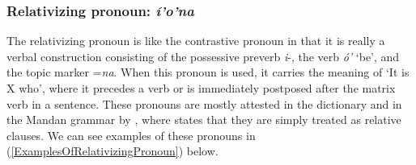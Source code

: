 \subsubsection{Relativizing pronoun: \textit{í'o'na}}\label{SubSubSecRelativizingPronoun}

The relativizing pronoun is like the contrastive pronoun in that it is really a verbal construction consisting of the possessive preverb \textit{i}-, the verb \textit{ó'} `be', and the topic marker =\textit{na}. When this pronoun is used, it carries the meaning of `It is X who', where it precedes a verb or is immediately postposed after the matrix verb in a sentence. These pronouns are mostly attested in the \citet{hollow1970} dictionary and in the Mandan grammar by \citet[26]{kennard1936}, where \citeauthor{kennard1936} states that they are simply treated as relative clauses. We can see examples of these pronouns in (\ref{ExamplesOfRelativizingPronoun}) below.

\newpage

